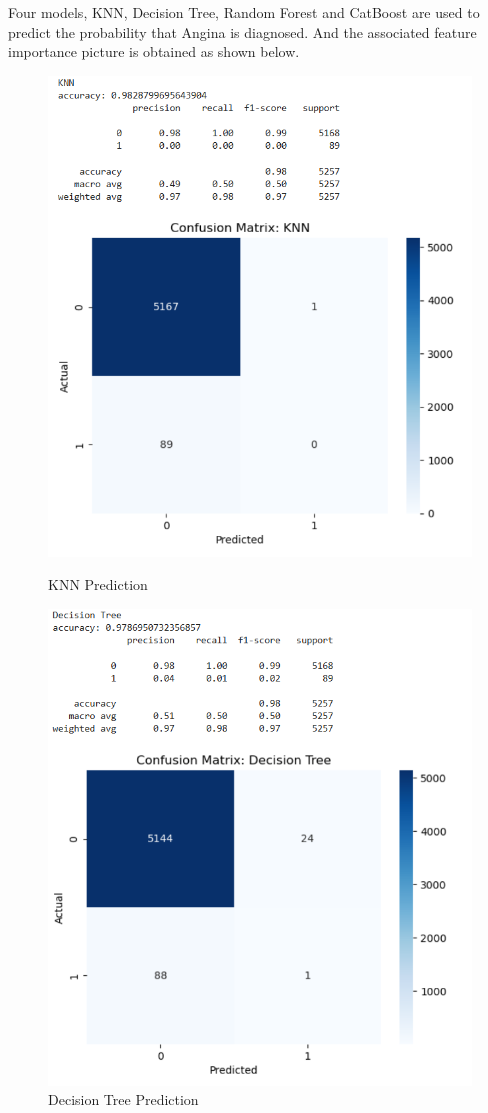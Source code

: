\documentclass{article}
\begin{document}
Four models, KNN, Decision Tree, Random Forest and CatBoost are used to predict the probability that Angina is diagnosed. And the associated feature importance picture is obtained as shown below.

\begin{figure}[h!]
	\begin{minipage}{0.48\textwidth}
		\centering
		\includegraphics[width=0.6\linewidth]{../Image/P16.jpg}
		\caption{KNN Prediction}
		\label{fig:P16}
	\end{minipage}\hfill
	\begin{minipage}{0.48\textwidth}
		\centering
		\includegraphics[width=0.6\linewidth]{../Image/P17.jpg}
		\caption{Decision Tree Prediction}
		\label{fig:P17}
	\end{minipage}
	
	\vspace{0.5cm} %
	

\end{figure}
\end{document}

